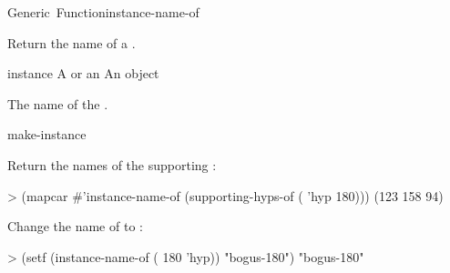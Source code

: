 \documentclass[10pt,twoside,english,pdftex]{article}
\begin{document}
\begin{functiondoc}{Generic~Function}{instance-name-of}{
    \returns{} }

\fnsyntax

\fnpurpose
Return the name of a .

\fnsetf
{}

\fnmethods
{}%
  {\code{(} 
  \returns{} }
%
  {\code{(} 
  \returns{} }

\fnpackage {}

\fnmodule {}

\fnargs
\begin{args}{instance}
\arg[instance] A  or an 
\arg[name] An object
\end{args}

\fnreturns The name of the .

\begin{alsos}{make-instance}
\end{alsos}

\fnexamples
{}%
Return the names of the  supporting
  :
\begin{example}
> (mapcar #'instance-name-of 
          (supporting-hyps-of ( 'hyp 180)))
(123 158 94)
\end{example}

%
Change the name of   to :
\begin{example}
> (setf (instance-name-of ( 180 'hyp)) "bogus-180")
"bogus-180"
\end{example}

\end{functiondoc}

\end{document}
